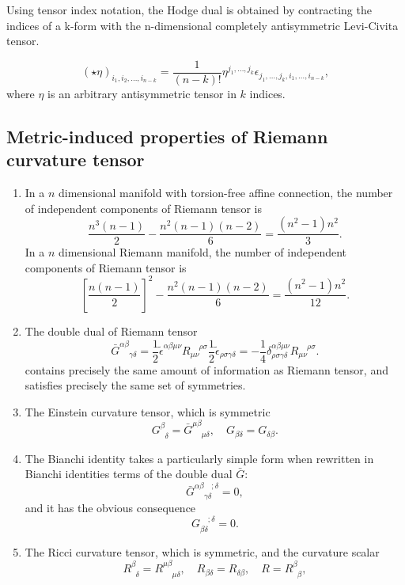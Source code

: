 \noindent
Using tensor index notation, the Hodge dual is obtained by contracting the indices of a k-form with the n-dimensional completely antisymmetric Levi-Civita tensor.\\

\begin{newprop}
\[(\star \eta )_{i_{1},i_{2},\ldots ,i_{n-k}}={\frac {1}{(n-k)!}}\eta ^{j_{1},\ldots ,j_{k}} \epsilon _{j_{1},\ldots ,j_{k},i_{1},\ldots ,i_{n-k}},\]
where $\eta$ is an arbitrary antisymmetric tensor in $k$ indices. 
\end{newprop}

\subsection{Metric-induced properties of Riemann curvature tensor}
\begin{enumerate}
\item In a $n$ dimensional manifold with torsion-free affine connection, the number of independent components of Riemann tensor is \[\frac{n^3(n-1)}{2} - \frac{n^2(n-1)(n-2)}{6} = \frac{(n^2-1)n^2}{3}.\]
In a $n$ dimensional Riemann manifold,  the number of independent components of Riemann tensor is \[\left[\frac{n(n-1)}{2}\right]^2 -\frac{n^2(n-1)(n-2)}{6} = \frac{(n^2-1)n^2}{12} .\]
\item  The double dual of Riemann tensor
\[\bar{G}^{\alpha \beta}_{\phantom{\alpha \beta} \gamma \delta} = \frac{1}{2} \tilde{\epsilon}^{\alpha \beta \mu \nu} R_{\mu \nu}^{\phantom{\mu \nu} \rho \sigma} \frac{1}{2} \tilde{\epsilon}_{\rho \sigma \gamma \delta} = -\frac{1}{4} \delta^{\alpha \beta \mu \nu}_{\rho \sigma \gamma \delta} R_{\mu \nu}^{\phantom{\mu \nu} \rho \sigma} .\]
contains precisely the same amount of information as
Riemann tensor, and satisfies precisely the same set of symmetries.
\item The Einstein curvature tensor, which is symmetric
\[G^{\beta}_{\phantom{\beta}\delta} = \bar{G}^{\mu \beta}_{\phantom{\mu \beta} \mu \delta} , \quad G_{\beta \delta}=G_{\delta \beta}.\]
\item The Bianchi identity takes a particularly simple form when rewritten in Bianchi identities terms of the double dual $\bar{G}$:
\[\bar{G}^{\alpha \beta \phantom{\gamma \delta};\delta}_{\phantom{\alpha \beta} \gamma \delta} = 0,\]
and it has the obvious consequence
\[G_{\beta \delta}^{\phantom{\beta \delta};\delta} = 0.\]
\item The Ricci curvature tensor, which is symmetric, and the curvature scalar
\[R^{\beta}_{\phantom{\beta}\delta} = R^{\mu \beta}_{\phantom{\mu \beta} \mu \delta} , \quad R_{\beta \delta}=R_{\delta \beta}, \quad R = R^{\beta}_{\phantom{\beta}\beta},\]

\end{enumerate}
